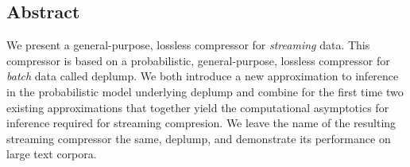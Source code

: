 \subsection*{Abstract}

We present a general-purpose, lossless compressor for {\em streaming} data.  This compressor is based on a probabilistic, general-purpose, lossless compressor for {\em batch} data called deplump.  We both introduce a new approximation to inference in the probabilistic model underlying deplump and combine for the first time two existing approximations that together yield the computational asymptotics for inference required for streaming compresion.  We leave the name of the resulting streaming compressor the same, deplump, and demonstrate its performance on large text corpora.